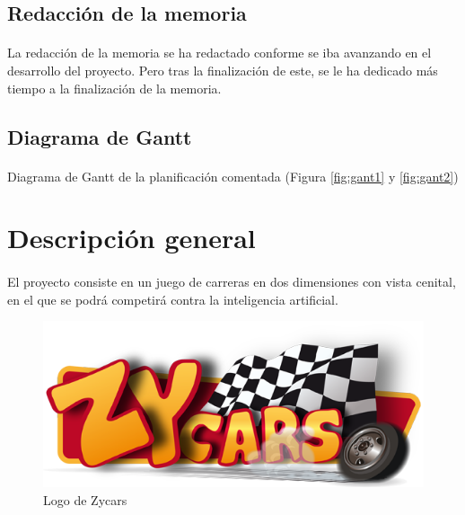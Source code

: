 \documentclass[a4paper,11pt]{article} %
\begin{document}
\subsection{Redacción de la memoria}

\paragraph{}
La redacción de la memoria se ha redactado conforme se iba avanzando en el desarrollo del proyecto. Pero tras la finalización
de este, se le ha dedicado más tiempo a la finalización de la memoria.

\subsection{Diagrama de Gantt}

\paragraph{}
Diagrama de Gantt de la planificación comentada (Figura \ref{fig:gant1} y \ref{fig:gant2})

\section{Descripción general}

\paragraph{}
El proyecto consiste en un juego de carreras en dos dimensiones con vista cenital, en el que se podrá competirá contra la 
inteligencia artificial. 

\begin{figure}[H]
  \label{logo_zycars}
  \begin{center}
    \includegraphics[scale=0.5]{imagenes/logo_zycars.png}
  \end{center}
  \caption{Logo de Zycars}
\end{figure}
\end{document}
